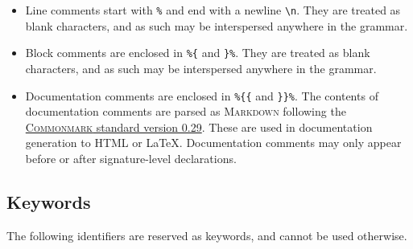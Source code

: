 \documentclass[11pt]{article}
\begin{document}
\begin{itemize}
\item
Line comments start with \texttt{\%} and end with a newline \texttt{\textbackslash n}.
They are treated as blank characters, and as such may be interspersed anywhere in the grammar.
\item
Block comments are enclosed in \texttt{\%\{} and \texttt{\}\%}.
They are treated as blank characters, and as such may be interspersed anywhere in the grammar.
\item
Documentation comments are enclosed in \texttt{\%\{\{} and \texttt{\}\}\%}.
The contents of documentation comments are parsed as \textsc{Markdown} following the \href{https://spec.commonmark.org/0.29}{\textsc{Commonmark} standard version 0.29}.
These are used in documentation generation to \textsc{HTML} or \LaTeX.
Documentation comments may only appear before or after signature-level declarations.
\end{itemize}

\subsection{Keywords}

The following identifiers are reserved as keywords, and cannot be used otherwise.
\end{document}
